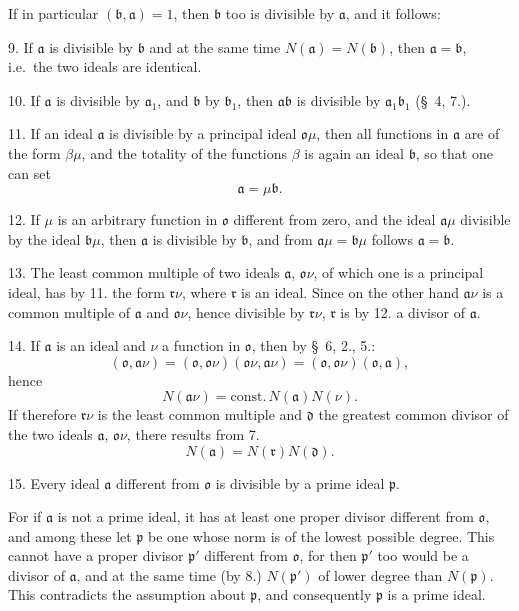 \documentclass{article}
\begin{document}
If in particular $(\mathfrak{b}, \mathfrak{a}) = 1$, then $\mathfrak{b}$ too is divisible by $\mathfrak{a}$, and it follows:

9. If $\mathfrak{a}$ is divisible by $\mathfrak{b}$ and at the same time $N(\mathfrak{a}) = N(\mathfrak{b})$, then $\mathfrak{a} = \mathfrak{b}$, i.e.\ the two ideals are identical.

10. If $\mathfrak{a}$ is divisible by $\mathfrak{a}_{1}$, and $\mathfrak{b}$ by $\mathfrak{b}_{1}$, then $\mathfrak{a}\mathfrak{b}$ is divisible by $\mathfrak{a}_{1}\mathfrak{b}_{1}$ (§~4, 7.).


11. If an ideal $\mathfrak{a}$ is divisible by a principal ideal $\mathfrak{o}\mu$, then all functions in $\mathfrak{a}$ are of the form $\beta\mu$, and the totality of the functions $\beta$ is again an ideal $\mathfrak{b}$, so that one can set
\[ \mathfrak{a} = \mu\mathfrak{b}. \]

12. If $\mu$ is an arbitrary function in $\mathfrak{o}$ different from zero, and the ideal $\mathfrak{a}\mu$ divisible by the ideal $\mathfrak{b}\mu$, then $\mathfrak{a}$ is divisible by $\mathfrak{b}$, and from $\mathfrak{a}\mu = \mathfrak{b}\mu$ follows $\mathfrak{a} = \mathfrak{b}$.

13. The least common multiple of two ideals $\mathfrak{a}$, $\mathfrak{o}\nu$, of which one is a principal ideal, has by 11. the form $\mathfrak{r}\nu$, where $\mathfrak{r}$ is an ideal. Since on the other hand $\mathfrak{a}\nu$ is a common multiple of $\mathfrak{a}$ and $\mathfrak{o}\nu$, hence divisible by $\mathfrak{r}\nu$, $\mathfrak{r}$ is by 12. a divisor of $\mathfrak{a}$.

14. If $\mathfrak{a}$ is an ideal and $\nu$ a function in $\mathfrak{o}$, then by §~6, 2., 5.:
\[ (\mathfrak{o}, \mathfrak{a}\nu) = (\mathfrak{o}, \mathfrak{o}\nu)(\mathfrak{o}\nu, \mathfrak{a}\nu) = (\mathfrak{o}, \mathfrak{o}\nu)(\mathfrak{o}, \mathfrak{a}), \]
hence
\[ N(\mathfrak{a}\nu) = \text{const.}\,N(\mathfrak{a})N(\nu). \]
If therefore $\mathfrak{r}\nu$ is the least common multiple and $\mathfrak{d}$ the greatest common divisor of the two ideals $\mathfrak{a}$, $\mathfrak{o}\nu$, there results from 7.
\[ N(\mathfrak{a}) = N(\mathfrak{r})N(\mathfrak{d}). \]

15. Every ideal $\mathfrak{a}$ different from $\mathfrak{o}$ is divisible by a prime ideal $\mathfrak{p}$.

For if $\mathfrak{a}$ is not a prime ideal, it has at least one proper divisor different from $\mathfrak{o}$, and among these let $\mathfrak{p}$ be one whose norm is of the lowest possible degree. This cannot have a proper divisor $\mathfrak{p}'$ different from $\mathfrak{o}$, for then $\mathfrak{p}'$ too would be a divisor of $\mathfrak{a}$, and at the same time (by 8.) $N(\mathfrak{p}')$ of lower degree than $N(\mathfrak{p})$. This contradicts the assumption about $\mathfrak{p}$, and consequently $\mathfrak{p}$ is a prime ideal.
\end{document}
